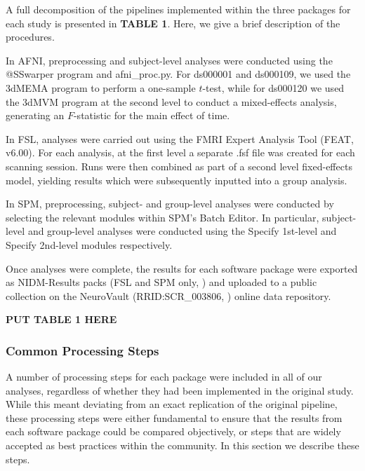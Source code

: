 A full decomposition of the pipelines implemented within the three packages for each study is presented in \textbf{TABLE 1}. Here, we give a brief description of the procedures. 

In AFNI, preprocessing and subject-level analyses were conducted using the @SSwarper program and afni\_proc.py. For ds000001 and ds000109, we used the 3dMEMA program to perform a one-sample $t$-test, while for ds000120 we used the 3dMVM program at the second level to conduct a mixed-effects analysis, generating an $F$-statistic for the main effect of time. 

In FSL, analyses were carried out using the FMRI Expert Analysis Tool (FEAT, v6.00). For each analysis, at the first level a separate .fsf file was created for each scanning session. Runs were then combined as part of a second level fixed-effects model, yielding results which were subsequently inputted into a group analysis. 

In SPM, preprocessing, subject- and group-level analyses were conducted by selecting the relevant modules within SPM's Batch Editor. In particular, subject-level and group-level analyses were conducted using the Specify 1st-level and Specify 2nd-level modules respectively. 

Once analyses were complete, the results for each software package were exported as NIDM-Results packs (FSL and SPM only, \citep{Maumet2016-se}) and uploaded to a public collection on the NeuroVault (RRID:SCR\_003806, \citep{Gorgolewski2015-vs}) online data repository. 

\textbf{PUT TABLE 1 HERE}

\subsubsection{Common Processing Steps}
A number of processing steps for each package were included in all of our analyses, regardless of whether they had been implemented in the original study. While this meant deviating from an exact replication of the original pipeline, these processing steps were either fundamental to ensure that the results from each software package could be compared objectively, or steps that are widely accepted as best practices within the community. In this section we describe these steps.

